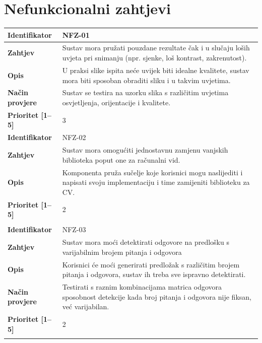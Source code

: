 \documentclass{foi}
\begin{document}
\section{Nefunkcionalni zahtjevi}

\begin{longtable}{|l|p{12cm}|}
    \hline
    \textbf{Identifikator} & NFZ-01 \\ \hline
    \textbf{Zahtjev} & Sustav mora pružati pouzdane rezultate čak i u slučaju loših uvjeta pri snimanju (npr. sjenke, loš kontrast, zakrenutost). \\ \hline
    \textbf{Opis} & U praksi slike ispita neće uvijek biti idealne kvalitete, sustav mora biti sposoban obraditi sliku i u takvim uvjetima. \\ \hline
    \textbf{Način provjere} & Sustav se testira na uzorku slika s različitim uvjetima osvjetljenja, orijentacije i kvalitete. \\ \hline
    \textbf{Prioritet [1--5]} & 3 \\ \hline
    \pagebreak
    
    \hline
    \textbf{Identifikator} & NFZ-02 \\ \hline
    \textbf{Zahtjev} & Sustav mora omogućiti jednostavnu zamjenu vanjskih biblioteka poput one za računalni vid. \\ \hline
    \textbf{Opis} & Komponenta pruža sučelje koje korisnici mogu naslijediti i napisati svoju implementaciju i time zamijeniti biblioteku za CV. \\ \hline
    \textbf{Prioritet [1--5]} & 2 \\ \hline
    \multicolumn{2}{|c|}{} \\ \hline


    \textbf{Identifikator} & NFZ-03  \\ \hline
    \textbf{Zahtjev} & Sustav mora moći detektirati odgovore na predlošku s varijabilnim brojem pitanja i odgovora \\ \hline
    \textbf{Opis} & Korisnici će moći generirati predložak s različitim brojem pitanja i odgovora, sustav ih treba sve ispravno detektirati. \\ \hline
    \textbf{Način provjere} & Testirati s raznim kombinacijama matrica odgovora sposobnost detekcije kada broj pitanja i odgovora nije fiksan, već varijabilan. \\ \hline
    \textbf{Prioritet [1--5]} & 2  \\ \hline
    \multicolumn{2}{|c|}{} \\ \hline


\end{longtable}
\end{document}
